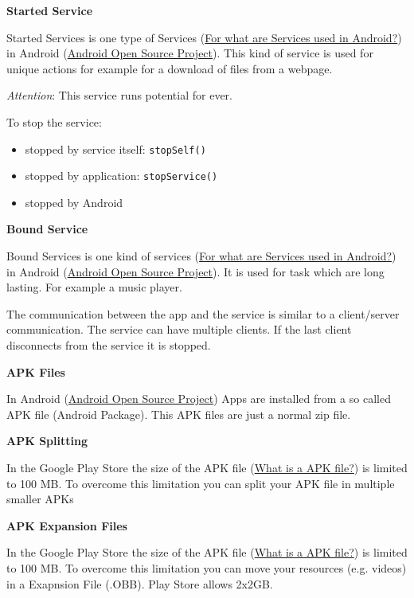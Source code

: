 \documentclass[11pt,twoside,landscape]{article}
\begin{document}
\begin{multicols}{3}
\textbf{Started Service}

Started Services is one type of Services (\href{../../../roam/20211109103648-for_what_are_services_used_in_android.org}{For what are Services used in Android?}) in Android (\href{../../../roam/20210921143632-aosp.org}{Android Open Source Project}).
This kind of service is used for unique actions for example for a download of files from a webpage.

\emph{Attention}: This service runs potential for ever.

To stop the service:
\begin{itemize}
\item stopped by service itself: \texttt{stopSelf()}
\item stopped by application: \texttt{stopService()}
\item stopped by Android
\end{itemize}

\textbf{Bound Service}

Bound Services is one kind of services (\href{../../../roam/20211109103648-for_what_are_services_used_in_android.org}{For what are Services used in Android?}) in Android (\href{../../../roam/20210921143632-aosp.org}{Android Open Source Project}).
It is used for task which are long lasting.
For example a music player.

The communication between the app and the service is similar to a client/server communication.
The service can have multiple clients.
If the last client disconnects from the service it is stopped. 

\textbf{APK Files}

In Android (\href{../../../roam/20210921143632-aosp.org}{Android Open Source Project}) Apps are installed from a so called APK file (Android Package).
This APK files are just a normal zip file.

\textbf{APK Splitting}

In the Google Play Store the size of the APK file (\href{../../../roam/20211109113541-what_is_a_apk_file.org}{What is a APK file?}) is limited to 100 MB.
To overcome this limitation you can split your APK file in multiple smaller APKs

\textbf{APK Expansion Files}

In the Google Play Store the size of the APK file (\href{../../../roam/20211109113541-what_is_a_apk_file.org}{What is a APK file?}) is limited to 100 MB.
To overcome this limitation you can move your resources (e.g. videos) in a Exapnsion File (.OBB).
Play Store allows 2x2GB.


\end{multicols}
\end{document}
